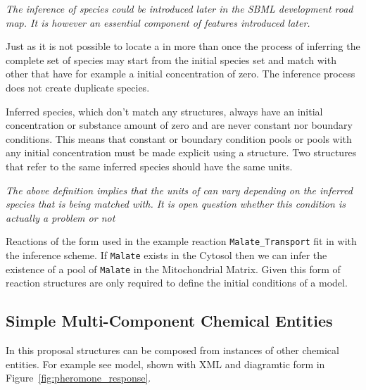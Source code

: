 \documentclass{cekarticle}
\begin{document}
\emph{The inference of species could be introduced later in the SBML development road map.
It is however an essential component of features introduced later.}

Just as it is not possible to locate a  in  more than
once the process of inferring the complete set of species may start from the initial species
set and match with other  that have for example a initial concentration of zero.
The inference process does not create duplicate species.

Inferred species, which don't match any  structures, always have an initial
concentration or substance amount of zero and are never
constant nor boundary conditions.  This means that constant or boundary condition pools or pools
with any initial concentration must be made explicit using a  structure.
Two 
 structures that refer to the same inferred species should have
the same units.

\emph{The above definition implies that the units of  can vary
depending on the inferred species that is being matched with.  It is open question whether this
condition is actually a problem or not}

Reactions of the form used in the example reaction \texttt{Malate\_Transport} fit in with the
inference scheme.  If \texttt{Malate} exists in the
Cytosol then we can infer the existence of a pool of \texttt{Malate} in the
Mitochondrial Matrix.  Given this form of reaction  structures are only
required to define the initial conditions of a model.

\subsection{Simple Multi-Component Chemical Entities}
\label{sec:multicomponentspecies}

In this proposal  structures can be composed from instances of other chemical
entities.  For example see model, shown with XML and diagramtic form in
Figure~\ref{fig:pheromone_response}.
\end{document}
